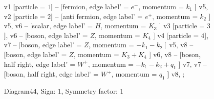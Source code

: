 \documentclass{revtex4}
\begin{document}
\begin{figure}[!htb]
\begin{center}
{    %
v1 [particle = \(1\)] -- [fermion, edge label' = \(e^{-}\), momentum = \(k_{1}\) ] v5, 
v2 [particle = \(2\)] -- [anti fermion, edge label' = \(e^{+}\), momentum = \(k_{2}\) ] v5, 
v6 -- [scalar, edge label' = \(H\), momentum = \(K_{3}\) ] v3 [particle = \(3\)], 
v6 -- [boson, edge label' = \(Z\), momentum = \(K_{4}\) ] v4 [particle = \(4\)], 
v7 -- [boson, edge label' = \(Z\), momentum = \(-k_{1} - k_{2}\) ] v5, 
v8 -- [boson, edge label' = \(Z\), momentum = \(K_{3} + K_{4}\) ] v6, 
v8 -- [boson, half right, edge label' = \(W^{+}\), momentum = \(-k_{1} - k_{2} + q_{1}\) ] v7, 
v7 -- [boson, half right, edge label' = \(W^{+}\), momentum = \(q_{1}\) ] v8, 
};
\end{center}
\caption{Diagram44, Sign: 1, Symmetry factor: 1}
\end{figure}
\newpage
\end{document}
